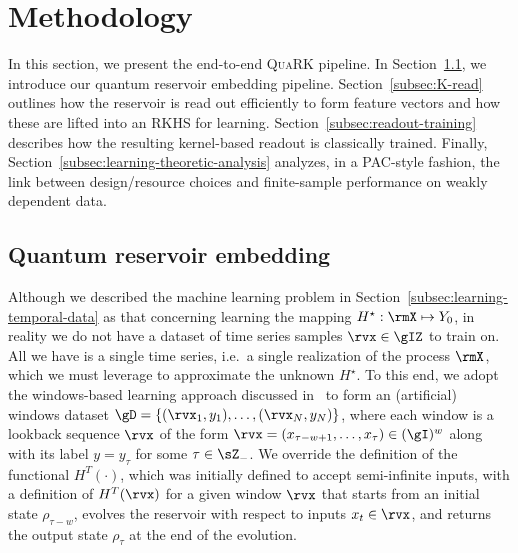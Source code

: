 \section{Methodology}\label{sec:methodology}
In this section, we present the end-to-end \textsc{QuaRK} pipeline. In Section~\ref{subsec:QR-embedding}, we introduce our quantum reservoir embedding pipeline. Section~\ref{subsec:K-read} outlines how the reservoir is read out efficiently to form feature vectors and how these are lifted into an RKHS for learning. Section~\ref{subsec:readout-training} describes how the resulting kernel-based readout is classically trained. Finally, Section~\ref{subsec:learning-theoretic-analysis} analyzes, in a PAC-style fashion, the link between design/resource choices and finite-sample performance on weakly dependent data.

\subsection{Quantum reservoir embedding}\label{subsec:QR-embedding}
Although we described the machine learning problem in Section~\ref{subsec:learning-temporal-data} as that concerning learning the mapping $H^\star: \rmX \mapsto Y_0$, in reality we do not have a dataset of time series samples $\rvx \in \gIZ$ to train on. All we have is a single time series, i.e.\ a single realization of the process $\rmX$, which we must leverage to approximate the unknown $H^\star$. To this end, we adopt the windows-based learning approach discussed in~\cite{Gonon_Grigoryeva_Ortega_2020} to form an (artificial) windows dataset $\gD = \{(\rvx_1, y_1), \dots, (\rvx_N, y_N)\}$, where each window is a lookback sequence $\rvx$ of the form $\rvx = (x_{\tau-w+1}, \dots, x_{\tau}) \in (\gI)^w$ along with its label $y = y_\tau$ for some $\tau \in \sZ_-$. We override the definition of the functional $H^T(\cdot)$, which was initially defined to accept semi-infinite inputs, with a definition of $H^T(\rvx)$ for a given window $\rvx$ that starts from an initial state $\rho_{\tau-w}$, evolves the reservoir with respect to inputs $x_t \in \rvx$, and returns the output state $\rho_\tau$ at the end of the evolution.

